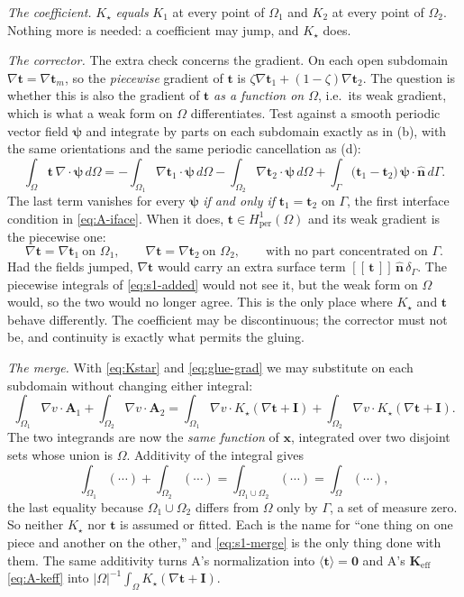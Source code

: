 \documentclass[11pt]{article}
\newcommand{\Om}{\Omega}
\newcommand{\Gam}{\Gamma}
\newcommand{\bn}{\hat{\mathbf n}}
\newcommand{\bt}{\mathbf t}
\newcommand{\bI}{\mathbf I}
\newcommand{\Keff}{\mathbf{K}_{\mathrm{eff}}}
\newcommand{\jump}[1]{[\![\,#1\,]\!]}
\newcommand{\Hper}{H^1_{\mathrm{per}}(\Om)}
\newcommand{\avg}[1]{\big\langle #1 \big\rangle}
\newcommand{\ind}{\zeta}  %
\begin{document}
\emph{The coefficient.} $K_\star$ \emph{equals} $K_1$ at every point of $\Om_1$
and $K_2$ at every point of $\Om_2$. Nothing more is needed: a coefficient may
jump, and $K_\star$ does.

\emph{The corrector.} The extra check concerns the gradient. On each open
subdomain $\nabla\bt=\nabla\bt_m$, so the \emph{piecewise} gradient of $\bt$ is
$\ind\nabla\bt_1+(1-\ind)\nabla\bt_2$. The question is whether this is also the
gradient of $\bt$ \emph{as a function on $\Om$}, i.e.\ its weak gradient,
which is what a weak form on $\Om$ differentiates. Test against a smooth
periodic vector field $\boldsymbol\psi$ and integrate by parts on each
subdomain exactly as in (b), with the same orientations and the same periodic
cancellation as (d):
\begin{equation}
\int_\Om \bt\,\nabla\!\cdot\!\boldsymbol\psi\,d\Om
=-\int_{\Om_1}\!\nabla\bt_1\cdot\boldsymbol\psi\,d\Om
 -\int_{\Om_2}\!\nabla\bt_2\cdot\boldsymbol\psi\,d\Om
 +\int_\Gam\big(\bt_1-\bt_2\big)\,\boldsymbol\psi\!\cdot\!\bn\,d\Gam .
\label{eq:glue}
\end{equation}
The last term vanishes for every $\boldsymbol\psi$ \emph{if and only if}
$\bt_1=\bt_2$ on $\Gam$, the first interface condition in \eqref{eq:A-iface}.
When it does, $\bt\in\Hper$ and its weak gradient is the piecewise one:
\begin{equation}
\nabla\bt=\nabla\bt_1\ \text{on }\Om_1,\qquad \nabla\bt=\nabla\bt_2\ \text{on }\Om_2,
\qquad\text{with no part concentrated on }\Gam .
\label{eq:glue-grad}
\end{equation}
Had the fields jumped, $\nabla\bt$ would carry an extra surface term
$\jump{\bt}\,\bn\,\delta_\Gam$. The piecewise integrals of \eqref{eq:s1-added}
would not see it, but the weak form on $\Om$ would, so the two would no longer
agree. This is the only place where
$K_\star$ and $\bt$ behave differently. The coefficient may be discontinuous; the
corrector must not be, and continuity is exactly what permits the gluing.

\emph{The merge.} With \eqref{eq:Kstar} and \eqref{eq:glue-grad} we may
substitute on each subdomain without changing either integral:
\begin{equation}
\int_{\Om_1}\!\nabla v\cdot\mathbf A_1
+\int_{\Om_2}\!\nabla v\cdot\mathbf A_2
=\int_{\Om_1}\!\nabla v\cdot K_\star(\nabla\bt+\bI)
+\int_{\Om_2}\!\nabla v\cdot K_\star(\nabla\bt+\bI).
\label{eq:s1-sub}
\end{equation}
The two integrands are now the \emph{same function} of $\mathbf x$, integrated
over two disjoint sets whose union is $\Om$. Additivity of the integral gives
\begin{equation}
\int_{\Om_1}(\cdots)+\int_{\Om_2}(\cdots)=\int_{\Om_1\cup\Om_2}(\cdots)=\int_{\Om}(\cdots),
\label{eq:s1-merge}
\end{equation}
the last equality because $\Om_1\cup\Om_2$ differs from $\Om$ only by $\Gam$,
a set of measure zero. So neither $K_\star$ nor $\bt$ is assumed or fitted.
Each is the name for ``one thing on one piece and another on the other,'' and
\eqref{eq:s1-merge} is the only thing done with them. The same additivity turns
A's normalization into $\avg{\bt}=\mathbf 0$ and A's $\Keff$
\eqref{eq:A-keff} into $|\Om|^{-1}\!\int_\Om K_\star(\nabla\bt+\bI)$.
\end{document}
